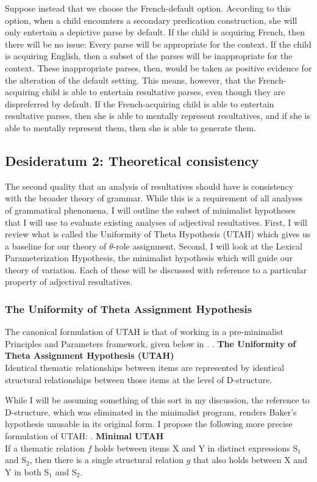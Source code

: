 Suppose instead that we choose the French-default option.
According to this option, when a child encounters a secondary predication construction, she will only entertain a depictive parse by default.
If the child is acquiring French, then there will be no issue:
Every parse will be appropriate for the context.
If the child is acquiring English, then a subset of the parses will be inappropriate for the context.
These inappropriate parses, then, would be taken as positive evidence for the alteration of the default setting.
This means, however, that the French-acquiring child is able to entertain resultative parses, even though they are dispreferred by default.
If the French-acquiring child is able to entertain resultative parses, then she is able to mentally represent resultatives, and if she is able to mentally represent them, then she is able to generate them.

\subsection{Desideratum 2: Theoretical consistency}
The second quality that an analysis of resultatives should have is consistency with the broader theory of grammar.
While this is a requirement of all analyses of grammatical phenomena, I will outline the subset of minimalist hypotheses that I will use to evaluate existing analyses of adjectival resultatives.
First, I will review what is called the Uniformity of Theta Hypothesis (UTAH) which gives us a baseline for our theory of $\theta$-role assignment.
Second, I will look at the Lexical Parameterization Hypothesis, the minimalist hypothesis which will guide our theory of variation.
Each of these will be discussed with reference to a particular property of adjectival resultatives.

\subsubsection{The Uniformity of Theta Assignment Hypothesis}
The canonical formulation of UTAH is that of \textcite{baker1988incorporation} working in a pre-minimalist Principles and Parameters framework, given below in \Next.
\ex. \textbf{The Uniformity of Theta Assignment Hypothesis (UTAH)}\\
Identical thematic relationships between items are represented by identical structural relationships between those items at the level of D-structure. \parencite[46]{baker1988incorporation}

While I will be assuming something of this sort in my discussion, the reference to D-structure, which was eliminated in the minimalist program, renders Baker's hypothesis unusable in its original form.
I propose the following more precise formulation of UTAH:
\ex. \textbf{Minimal UTAH}\\
If a thematic relation $f$ holds between items X and Y in distinct expressions S$_1$ and S$_2$, then there is a single structural relation $g$ that also holds between X and Y in both S$_1$ and S$_2$.

